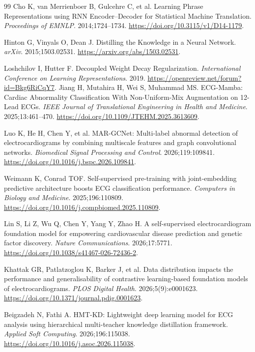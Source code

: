 \documentclass[11pt,a4paper,UTF8,fontset=windows]{ctexart}
\begin{document}
\begin{thebibliography}{99}
 Cho K, van Merrienboer B, Gulcehre C, et al. Learning Phrase Representations using RNN Encoder--Decoder for Statistical Machine Translation. \emph{Proceedings of EMNLP}. 2014;1724--1734. \url{https://doi.org/10.3115/v1/D14-1179}.

 Hinton G, Vinyals O, Dean J. Distilling the Knowledge in a Neural Network. \emph{arXiv}. 2015;1503.02531. \url{https://arxiv.org/abs/1503.02531}.

 Loshchilov I, Hutter F. Decoupled Weight Decay Regularization. \emph{International Conference on Learning Representations}. 2019. \url{https://openreview.net/forum?id=Bkg6RiCqY7}.
 Jiang H, Mutahira H, Wei S, Muhammad MS. ECG-Mamba: Cardiac Abnormality Classification With Non-Uniform-Mix Augmentation on 12-Lead ECGs. \emph{IEEE Journal of Translational Engineering in Health and Medicine}. 2025;13:461--470. \url{https://doi.org/10.1109/JTEHM.2025.3613609}.

 Luo K, He H, Chen Y, et al. MAR-GCNet: Multi-label abnormal detection of electrocardiograms by combining multiscale features and graph convolutional networks. \emph{Biomedical Signal Processing and Control}. 2026;119:109841. \url{https://doi.org/10.1016/j.bspc.2026.109841}.

 Weimann K, Conrad TOF. Self-supervised pre-training with joint-embedding predictive architecture boosts ECG classification performance. \emph{Computers in Biology and Medicine}. 2025;196:110809. \url{https://doi.org/10.1016/j.compbiomed.2025.110809}.

 Lin S, Li Z, Wu Q, Chen Y, Yang Y, Zhao H. A self-supervised electrocardiogram foundation model for empowering cardiovascular disease prediction and genetic factor discovery. \emph{Nature Communications}. 2026;17:5771. \url{https://doi.org/10.1038/s41467-026-72436-2}.

 Khattak GR, Patlatzoglou K, Barker J, et al. Data distribution impacts the performance and generalisability of contrastive learning-based foundation models of electrocardiograms. \emph{PLOS Digital Health}. 2026;5(9):e0001623. \url{https://doi.org/10.1371/journal.pdig.0001623}.

 Beigzadeh N, Fathi A. HMT-KD: Lightweight deep learning model for ECG analysis using hierarchical multi-teacher knowledge distillation framework. \emph{Applied Soft Computing}. 2026;196:115038. \url{https://doi.org/10.1016/j.asoc.2026.115038}.


\end{thebibliography}
\end{document}
